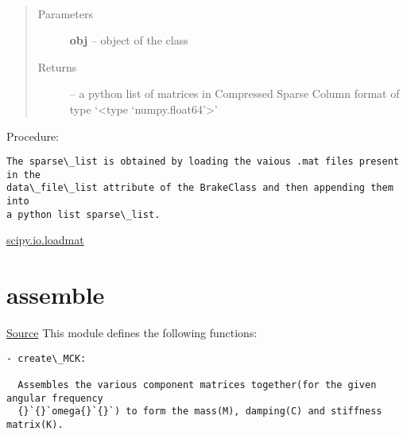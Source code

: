 \documentclass[letterpaper,10pt,english]{sphinxmanual}
\begin{document}
\begin{fulllineitems}
\label{index:brake.initialize.load.load_matrices}~\begin{quote}\begin{description}
\item[{Parameters}] \leavevmode
\textbf{obj} -- object of the class 

\item[{Returns}] \leavevmode
{} -- a python list of matrices in Compressed Sparse Column format 
of type `\textless{}type `numpy.float64'\textgreater{}'

\end{description}\end{quote}

Procedure:

\begin{Verbatim}[commandchars=\\\{\}]
The sparse\_list is obtained by loading the vaious .mat files present in the
data\_file\_list attribute of the BrakeClass and then appending them into
a python list sparse\_list.
\end{Verbatim}

\end{fulllineitems}





\href{http://docs.scipy.org/doc/scipy-0.14.0/reference/generated/scipy.io.loadmat.html}{scipy.io.loadmat}




\section{assemble}
\label{index:assemble}
\href{https://bitbucket.org/akadar/brakesqueal0.1/src/10fdbd0824e88ebbee4f44cefa781c01e586db41/brake/initialize/assemble.py?at=master}{Source}
\label{index:module-brake.initialize.assemble}
This module defines the following functions:

\begin{Verbatim}[commandchars=\\\{\}]
- create\_MCK:

  Assembles the various component matrices together(for the given angular frequency
  {}`{}`omega{}`{}`) to form the mass(M), damping(C) and stiffness matrix(K).
\end{Verbatim}
\end{document}
